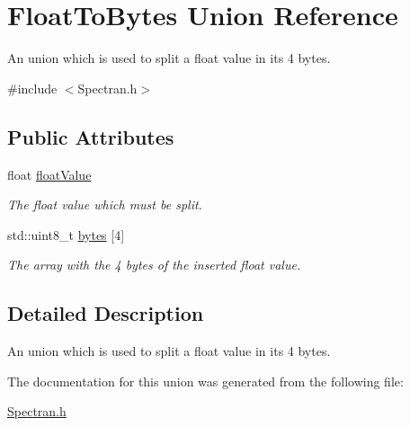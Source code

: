 \hypertarget{unionFloatToBytes}{}\section{Float\+To\+Bytes Union Reference}
\label{unionFloatToBytes}


An union which is used to split a {\ttfamily float} value in its 4 bytes.  




{\ttfamily \#include $<$Spectran.\+h$>$}

\subsection*{Public Attributes}
\begin{DoxyCompactItemize}
\item 
\mbox{\label{unionFloatToBytes_a446d779e6c020ceb138be65a8b5bb7fb}} 
float \hyperlink{unionFloatToBytes_a446d779e6c020ceb138be65a8b5bb7fb}{float\+Value}
\begin{DoxyCompactList}\small\item\em The {\ttfamily float} value which must be split. \end{DoxyCompactList}\item 
\mbox{\label{unionFloatToBytes_adc2324525bc45e5052501c6650b5afb6}} 
std\+::uint8\+\_\+t \hyperlink{unionFloatToBytes_adc2324525bc45e5052501c6650b5afb6}{bytes} \mbox{[}4\mbox{]}
\begin{DoxyCompactList}\small\item\em The array with the 4 bytes of the inserted {\ttfamily float} value. \end{DoxyCompactList}\end{DoxyCompactItemize}


\subsection{Detailed Description}
An union which is used to split a {\ttfamily float} value in its 4 bytes. 

The documentation for this union was generated from the following file\+:\begin{DoxyCompactItemize}
\item 
\hyperlink{Spectran_8h}{Spectran.\+h}\end{DoxyCompactItemize}
